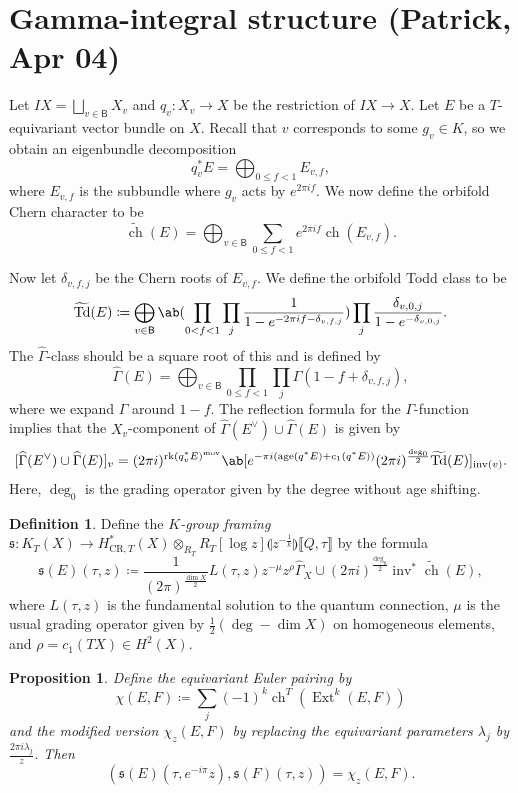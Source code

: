 \documentclass[leqno, openany]{memoir}
\newtheorem{prop}[thm]{Proposition}
\theoremstyle{definition}
\newtheorem{defn}[thm]{Definition}
\theoremstyle{remark}
\theoremstyle{plain}
\theoremstyle{definition}
\theoremstyle{remark}
\newcommand{\mf}[1]{\mathfrak{#1}}
\newcommand{\mr}[1]{\mathrm{#1}}
\newcommand{\ms}[1]{\mathsf{#1}}
\newcommand{\on}[1]{\operatorname{#1}}
\newcommand{\wt}[1]{\widetilde{#1}}
\newcommand{\wh}[1]{\widehat{#1}}
\DeclareMathOperator{\Ext}{Ext}
\DeclareMathOperator{\ch}{ch}
\begin{document}
\section{Gamma-integral structure (Patrick, Apr 04)}%
\label{sec:Gamma-integral structure}

Let $IX = \bigsqcup_{v \in \ms{B}} X_v$ and $q_v \colon X_v \to X$ be the restriction of $IX \to X$. Let $E$ be a $T$-equivariant vector bundle on $X$. Recall that $v$ corresponds to some $g_v \in K$, so we obtain an eigenbundle decomposition
\[ q_v^* E = \bigoplus_{0 \leq f < 1} E_{v,f}, \]
where $E_{v,f}$ is the subbundle where $g_v$ acts by $e^{2 \pi i f}$. We now define the orbifold Chern character to be
\[ \wt{\ch}(E) = \bigoplus_{v \in\ms{B}} \sum_{0 \leq f < 1} e^{2\pi i f} \ch(E_{v,f}). \]

Now let $\delta_{v,f,j}$ be the Chern roots of $E_{v,f}$. We define the orbifold Todd class to be
\[ \wt{\mr{Td}}(E) \coloneqq \bigoplus_{v \in \ms{B}} \ab(\prod_{0 < f < 1} \prod_{j} \frac{1}{1-e^{-2\pi i f - \delta_{v,f,j}}}) \prod_j \frac{\delta_{v,0,j}}{1-e^{-\delta_{v,0,j}}}. \]
The $\wh{\Gamma}$-class should be a square root of this and is defined by
\[ \wh{\Gamma}(E) = \bigoplus_{v \in \ms{B}} \prod_{0 \leq f < 1} \prod_j \Gamma(1-f+\delta_{v,f,j}), \]
where we expand $\Gamma$ around $1-f$. The reflection formula for the $\Gamma$-function implies that the $X_v$-component of $\wh{\Gamma}(E^{\vee}) \cup \wh{\Gamma}(E)$ is given by
\[ [\wh{\Gamma}(E^{\vee}) \cup \wh{\Gamma}(E)]_v = (2\pi i)^{\on{rk} (q_v^* E)^{\mr{mov}}} \ab[e^{-\pi i ( \on{age}(q^* E) + c_1(q^* E) )} (2\pi i)^{\frac{\deg_0}{2}} \wt{\mr{Td}}(E)]_{\on{inv}(v)}. \]
Here, $\deg_0$ is the grading operator given by the degree without age shifting.

\begin{defn}
    Define the \textit{$K$-group framing} $\mf{s} \colon K_T(X) \to H^*_{\mr{CR},T}(X) \otimes_{R_T} R_T[\log z] \llparenthesis z^{-\frac{1}{k}} \rrparenthesis \llbracket Q,\tau \rrbracket$ by the formula
    \[ \mf{s}(E)(\tau, z) \coloneqq \frac{1}{(2\pi)^{\frac{\dim X}{2}}} L(\tau, z) z^{-\mu} z^{\rho} \wh{\Gamma}_X \cup (2\pi i)^{\frac{\deg_0}{2}} \on{inv}^* \wt{\ch}(E), \]
    where $L(\tau, z)$ is the fundamental solution to the quantum connection, $\mu$ is the usual grading operator given by $\frac{1}{2} (\deg - \dim X)$ on homogeneous elements, and $\rho = c_1(TX) \in H^2(X)$.
\end{defn}

\begin{prop}
    Define the equivariant Euler pairing by
    \[ \chi(E,F) \coloneqq \sum_{j} (-1)^k \ch^T(\Ext^k(E,F)) \]
    and the modified version $\chi_z(E,F)$ by replacing the equivariant parameters $\lambda_j$ by $\frac{2\pi i \lambda_j}{z}$. Then
    \[ (\mf{s}(E)(\tau, e^{-i\pi}z), \mf{s}(F)(\tau, z)) = \chi_z(E,F). \]
\end{prop}
\end{document}

